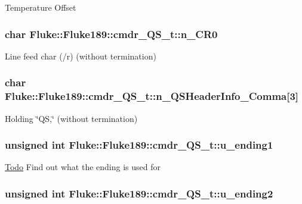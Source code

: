 \label{structFluke_1_1Fluke189_1_1cmdr__QS__t_a3ae4f44738b591f2dc068793861f2ea3}
Temperature Offset \hypertarget{structFluke_1_1Fluke189_1_1cmdr__QS__t_ac75ebbfd5c0fca3ed9debbf46fc71b61}{
\subsubsection[{n\_\-CR0}]{\setlength{\rightskip}{0pt plus 5cm}char {\bf Fluke::Fluke189::cmdr\_\-QS\_\-t::n\_\-CR0}}}
\label{structFluke_1_1Fluke189_1_1cmdr__QS__t_ac75ebbfd5c0fca3ed9debbf46fc71b61}
Line feed char (/r) (without termination) \hypertarget{structFluke_1_1Fluke189_1_1cmdr__QS__t_af2e192902c6c5598c38ebd1c33b3efd4}{
\subsubsection[{n\_\-QSHeaderInfo\_\-Comma}]{\setlength{\rightskip}{0pt plus 5cm}char {\bf Fluke::Fluke189::cmdr\_\-QS\_\-t::n\_\-QSHeaderInfo\_\-Comma}\mbox{[}3\mbox{]}}}
\label{structFluke_1_1Fluke189_1_1cmdr__QS__t_af2e192902c6c5598c38ebd1c33b3efd4}
Holding \char`\"{}QS,\char`\"{} (without termination) \hypertarget{structFluke_1_1Fluke189_1_1cmdr__QS__t_ae5e99fd781866c32cdba484e15276d7a}{
\subsubsection[{u\_\-ending1}]{\setlength{\rightskip}{0pt plus 5cm}unsigned int {\bf Fluke::Fluke189::cmdr\_\-QS\_\-t::u\_\-ending1}}}
\label{structFluke_1_1Fluke189_1_1cmdr__QS__t_ae5e99fd781866c32cdba484e15276d7a}
\begin{Desc}
\item[\hyperlink{todo__todo000007}{Todo}]Find out what the ending is used for \end{Desc}
\hypertarget{structFluke_1_1Fluke189_1_1cmdr__QS__t_a08dec92163b6c7a734cdf4aa185d0875}{
\subsubsection[{u\_\-ending2}]{\setlength{\rightskip}{0pt plus 5cm}unsigned int {\bf Fluke::Fluke189::cmdr\_\-QS\_\-t::u\_\-ending2}}}
